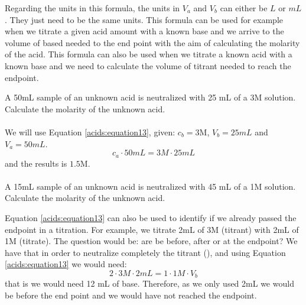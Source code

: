 \documentclass[main.tex]{subfiles}
\newcommand\chapterlabel{acids}
\begin{document}
\begin{description}
Regarding the units in this formula, the units in $V_a$ and $V_b$ can either be $L$ or $mL$. They just need to be the same units. This formula can be used for example when we titrate a given acid amount with a known base and we arrive to the volume of based needed to the end point with the aim of calculating the molarity of the acid. This formula can also be used when we titrate a known acid with a known base and we need to calculate the volume of titrant needed to reach the endpoint.

\begin{example} %
A 50mL sample of an unknown acid is neutralized with 25 mL of a  3M solution. Calculate the molarity of the unknown acid.
\\
\\
We will use Equation \ref{\chapterlabel:equation13}, given: $c_b=3$M, $V_b=25mL$ and $V_a=50mL$.
\begin{equation*}
c_a\cdot 50mL=3M\cdot 25mL 
 \end{equation*}
and the results is $1.5$M.
\\
\faDiamond\ \\
A 15mL sample of an unknown acid is neutralized with 45 mL of a  1M solution. Calculate the molarity of the unknown acid.
\end{example}%
Equation \ref{\chapterlabel:equation13} can also be used to identify if we already passed the endpoint in a titration. For example, we titrate 2mL of 3M  (titrant) with 2mL of 1M  (titrate). The question would be: are be before, after or at the endpoint? We have that in order to neutralize completely the titrant (), and using Equation \ref{\chapterlabel:equation13} we would need:
\[2\cdot 3M\cdot 2mL=1\cdot 1M\cdot V_b\]
that is we would need 12 mL of base. Therefore, as we only used 2mL we would be before the end point and we would have not reached the endpoint.


\end{description}
\end{document}

